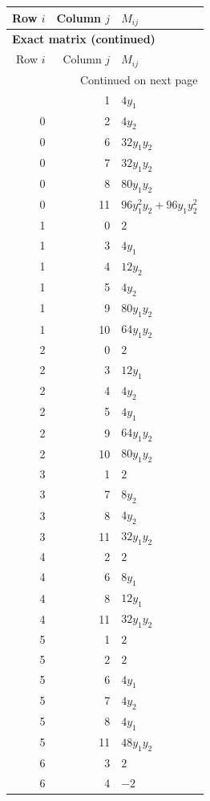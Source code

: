 \documentclass[10pt,a4paper]{article}
\begin{document}
{\small\setlength{\tabcolsep}{7pt}\begin{longtable}{rrp{125mm}}
\toprule Row $i$ & Column $j$ & $M_{ij}$\\\midrule\endfirsthead
\multicolumn{3}{l}{\textbf{Exact matrix (continued)}}\\
\toprule Row $i$ & Column $j$ & $M_{ij}$\\\midrule\endhead
\midrule\multicolumn{3}{r}{Continued on next page}\\\endfoot\bottomrule\endlastfoot
0 & 1 & $4 y_{1}$\\
0 & 2 & $4 y_{2}$\\
0 & 6 & $32 y_{1} y_{2}$\\
0 & 7 & $32 y_{1} y_{2}$\\
0 & 8 & $80 y_{1} y_{2}$\\
0 & 11 & $96 y_{1}^{2} y_{2} + 96 y_{1} y_{2}^{2}$\\
1 & 0 & $2$\\
1 & 3 & $4 y_{1}$\\
1 & 4 & $12 y_{2}$\\
1 & 5 & $4 y_{2}$\\
1 & 9 & $80 y_{1} y_{2}$\\
1 & 10 & $64 y_{1} y_{2}$\\
2 & 0 & $2$\\
2 & 3 & $12 y_{1}$\\
2 & 4 & $4 y_{2}$\\
2 & 5 & $4 y_{1}$\\
2 & 9 & $64 y_{1} y_{2}$\\
2 & 10 & $80 y_{1} y_{2}$\\
3 & 1 & $2$\\
3 & 7 & $8 y_{2}$\\
3 & 8 & $4 y_{2}$\\
3 & 11 & $32 y_{1} y_{2}$\\
4 & 2 & $2$\\
4 & 6 & $8 y_{1}$\\
4 & 8 & $12 y_{1}$\\
4 & 11 & $32 y_{1} y_{2}$\\
5 & 1 & $2$\\
5 & 2 & $2$\\
5 & 6 & $4 y_{1}$\\
5 & 7 & $4 y_{2}$\\
5 & 8 & $4 y_{1}$\\
5 & 11 & $48 y_{1} y_{2}$\\
6 & 3 & $2$\\
6 & 4 & $-2$\\

\end{longtable}}
\end{document}
